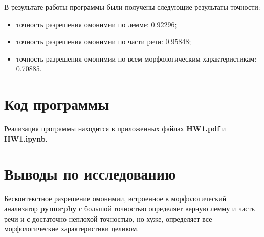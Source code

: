 \documentclass[oneside,final,12pt]{article}
\begin{document}
В результате работы программы были получены следующие результаты точности:

\begin{itemize}
	\item точность разрешения омонимии по лемме: 0.92296;
	\item точность разрешения омонимии по части речи: 0.95848;
	\item точность разрешения омонимии по всем морфологическим характеристикам: 0.70885.
\end{itemize}

\section{Код программы}

Реализация программы находится в приложенных файлах \textbf{HW1.pdf} и \textbf{HW1.ipynb}.

\newpage


\section{Выводы по исследованию}

Бесконтекстное разрешение омонимии, встроенное в морфологический анализатор \textbf{pymorphy} с большой точностью определяет верную лемму и часть речи и с достаточно неплохой точностью, но хуже, определяет все морфологические характеристики целиком.
\end{document}
